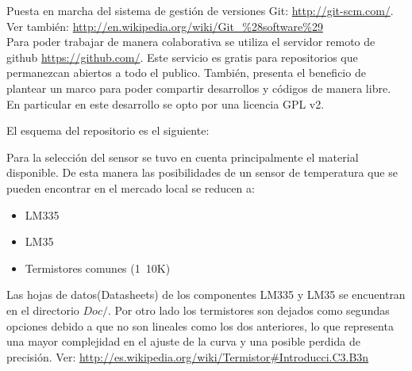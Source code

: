 
Puesta en marcha del sistema de gestión de versiones Git: \url{http://git-scm.com/}.
Ver también: \url{http://en.wikipedia.org/wiki/Git_%28software%29}\\
Para poder trabajar de manera colaborativa se utiliza el servidor remoto
de github \url{https://github.com/}. Este servicio es gratis para repositorios 
que permanezcan abiertos a todo el publico. También, presenta el beneficio de 
plantear un marco para poder compartir desarrollos y códigos de manera libre.
En particular en este desarrollo se opto por una licencia GPL v2.

El esquema del repositorio es el siguiente:


Para la selección del sensor se tuvo en cuenta principalmente el material disponible.
De esta manera las posibilidades de un sensor de temperatura que se pueden encontrar 
en el mercado local se reducen a:
\begin{itemize}
 \item LM335
 \item LM35
 \item Termistores comunes (1~10K)
\end{itemize}
Las hojas de datos(Datasheets) de los componentes LM335 y LM35 se encuentran en el directorio
$Doc/$. Por otro lado los termistores son dejados como segundas opciones debido a que no son
lineales como los dos anteriores, lo que representa una mayor complejidad en el ajuste de la 
curva y una posible perdida de precisión. 
Ver: \url{http://es.wikipedia.org/wiki/Termistor#Introducci.C3.B3n}

